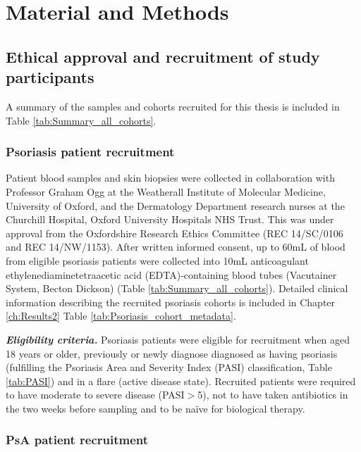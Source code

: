 \chapter{Material and Methods}
\label{ch:Mat}



\section{Ethical approval and recruitment of study participants}
A summary of the samples and cohorts recruited for this thesis is included in Table \ref{tab:Summary_all_cohorts}.

\subsection{Psoriasis patient recruitment}

Patient blood samples and skin biopsies were collected in collaboration with Professor Graham Ogg at the Weatherall Institute of Molecular Medicine, University of Oxford, and the Dermatology Department research nurses at the Churchill Hospital, Oxford University Hospitals NHS Trust. This was under approval from the Oxfordshire Research Ethics Committee (REC 14/SC/0106 and REC 14/NW/1153). After written informed consent, up to 60mL of blood from eligible psoriasis patients were collected into 10mL anticoagulant ethylenediaminetetraacetic acid (EDTA)-containing blood tubes (Vacutainer System, Becton Dickson) (Table \ref{tab:Summary_all_cohorts}). Detailed clinical information describing the recruited psoriasis cohorts is included in Chapter \ref{ch:Results2} Table \ref{tab:Psoriasis_cohort_metadata}.

\textit{\textbf{Eligibility criteria.}} Psoriasis patients were eligible for recruitment when aged 18 years or older, previously or newly diagnose diagnosed as having psoriasis (fulfilling the Psoriasis Area and Severity Index (PASI) classification, Table \ref{tab:PASI}) and in a flare (active disease state). Recruited patients were required to have moderate to severe disease (PASI$>$5), not to have taken antibiotics in the two weeks before sampling and to be na\"{i}ve for biological therapy. 



\subsection{PsA patient recruitment}

